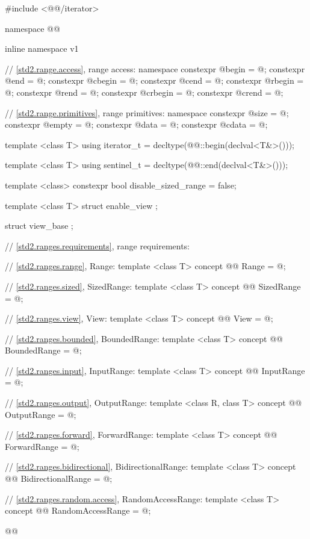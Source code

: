 %
\begin{codeblock}
#include <@@/iterator>

namespace @@ { inline namespace v1 {
  // \ref{std2.range.access}, range access:
  namespace {
    constexpr @\unspec@ begin = @\unspec@;
    constexpr @\unspec@ end = @\unspec@;
    constexpr @\unspec@ cbegin = @\unspec@;
    constexpr @\unspec@ cend = @\unspec@;
    constexpr @\unspec@ rbegin = @\unspec@;
    constexpr @\unspec@ rend = @\unspec@;
    constexpr @\unspec@ crbegin = @\unspec@;
    constexpr @\unspec@ crend = @\unspec@;
  }

  // \ref{std2.range.primitives}, range primitives:
  namespace {
    constexpr @\unspec@ size = @\unspec@;
    constexpr @\unspec@ empty = @\unspec@;
    constexpr @\unspec@ data = @\unspec@;
    constexpr @\unspec@ cdata = @\unspec@;
  }

  template <class T>
  using iterator_t = decltype(@@::begin(declval<T&>()));

  template <class T>
  using sentinel_t = decltype(@@::end(declval<T&>()));

  template <class>
  constexpr bool disable_sized_range = false;

  template <class T>
  struct enable_view { };

  struct view_base { };

  // \ref{std2.ranges.requirements}, range requirements:

  // \ref{std2.ranges.range}, Range:
  template <class T>
  concept @@ Range = @\seebelow@;

  // \ref{std2.ranges.sized}, SizedRange:
  template <class T>
  concept @@ SizedRange = @\seebelow@;

  // \ref{std2.ranges.view}, View:
  template <class T>
  concept @@ View = @\seebelow@;

  // \ref{std2.ranges.bounded}, BoundedRange:
  template <class T>
  concept @@ BoundedRange = @\seebelow@;

  // \ref{std2.ranges.input}, InputRange:
  template <class T>
  concept @@ InputRange = @\seebelow@;

  // \ref{std2.ranges.output}, OutputRange:
  template <class R, class T>
  concept @@ OutputRange = @\seebelow@;

  // \ref{std2.ranges.forward}, ForwardRange:
  template <class T>
  concept @@ ForwardRange = @\seebelow@;

  // \ref{std2.ranges.bidirectional}, BidirectionalRange:
  template <class T>
  concept @@ BidirectionalRange = @\seebelow@;

  // \ref{std2.ranges.random.access}, RandomAccessRange:
  template <class T>
  concept @@ RandomAccessRange = @\seebelow@;
}}@\removed{\}\}}@
\end{codeblock}

